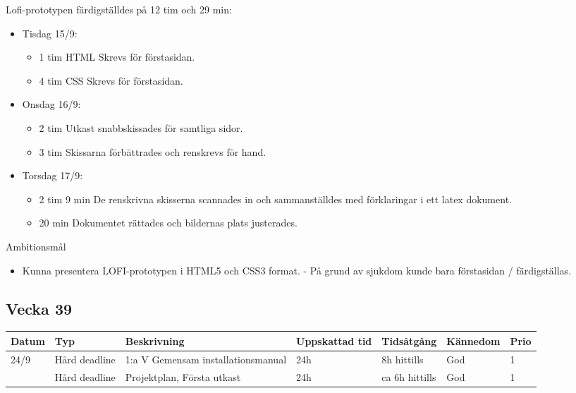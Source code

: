 \documentclass{TDP003mall}
\begin{document}
Lofi-prototypen färdigställdes på 12 tim och 29 min:
\begin{itemize}
	\item Tisdag 15/9:
	\begin{itemize}
		\item 1 tim HTML Skrevs för förstasidan.
		\item 4 tim CSS Skrevs för förstasidan.
	\end{itemize}
	\item Onsdag 16/9:
	\begin{itemize}
		\item 2 tim Utkast snabbskissades för samtliga sidor.
		\item 3 tim Skissarna förbättrades och renskrevs för hand.
	\end{itemize}
	\item Torsdag 17/9:
	\begin{itemize}
		\item 2 tim 9 min De renskrivna skisserna scannades in och sammanställdes med förklaringar i ett latex dokument.
		\item 20 min Dokumentet rättades och bildernas plats justerades.\\
	\end{itemize}
\end{itemize}


Ambitionsmål
\begin{itemize}
  \item Kunna presentera LOFI-prototypen i HTML5 och CSS3 format. - På grund av sjukdom kunde bara förstasidan / färdigställas.
  \end{itemize}
  
\newpage


  
\subsection{Vecka 39}
\begin{tabularx}{\linewidth}{|l|l|X|l|l|l|l|}
	\hline
	Datum & Typ           & Beskrivning                        & Uppskattad tid & Tidsåtgång     & Kännedom & Prio \\ [0.5ex]
	\hline                                     
	24/9  & Hård deadline & 1:a V Gemensam installationsmanual & 24h            & 8h hittills    & God      & 1    \\
	\hline                                     
          & Hård deadline & Projektplan, Första utkast         & 24h            & ca 6h hittills & God      & 1    \\
	\hline
\end{tabularx}
\end{document}
